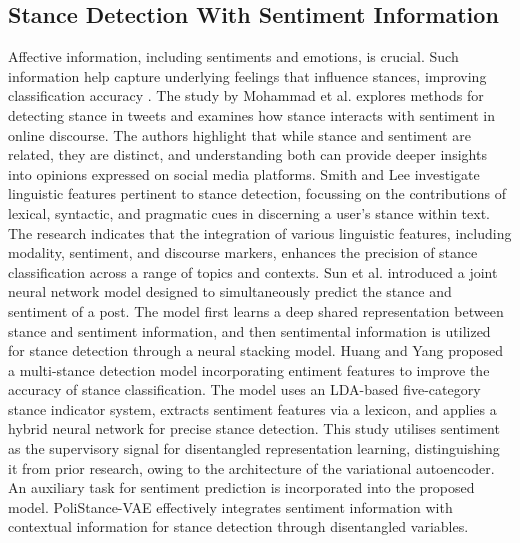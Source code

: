 \subsection{Stance Detection With Sentiment Information}
Affective information, including sentiments and emotions, is crucial. Such information help capture underlying feelings that influence stances, improving classification accuracy \cite{luo2022exploiting,zhang2020enhancing}. The study by Mohammad et al. \cite{sobhani2016detecting} explores methods for detecting stance in tweets and examines how stance interacts with sentiment in online discourse. The authors highlight that while stance and sentiment are related, they are distinct, and understanding both can provide deeper insights into opinions expressed on social media platforms. Smith and Lee \cite{sun2016exploring} investigate linguistic features pertinent to stance detection, focussing on the contributions of lexical, syntactic, and pragmatic cues in discerning a user's stance within text. The research indicates that the integration of various linguistic features, including modality, sentiment, and discourse markers, enhances the precision of stance classification across a range of topics and contexts. Sun et al. \cite{sun2019stance} introduced a joint neural network model designed to simultaneously predict the stance and sentiment of a post. The model first learns a deep shared representation between stance and sentiment information, and then sentimental information is utilized for stance detection through a neural stacking model. Huang and Yang \cite{huang2024multi} proposed a multi-stance detection model incorporating entiment features to improve the accuracy of stance classification. The model uses an LDA-based five-category stance indicator system, extracts sentiment features via a lexicon, and applies a hybrid neural network for precise stance detection. This study utilises sentiment as the supervisory signal for disentangled representation learning, distinguishing it from prior research, owing to the architecture of the variational autoencoder. An auxiliary task for sentiment prediction is incorporated into the proposed model. PoliStance-VAE effectively integrates sentiment information with contextual information for stance detection through disentangled variables.